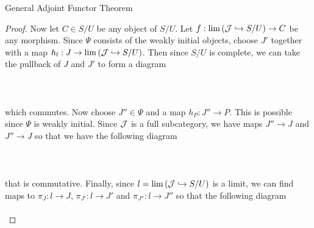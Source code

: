 \documentclass[a4paper]{article}
\begin{document}
\begin{thm}{General Adjoint Functor Theorem}{}
\begin{proof}
Now let $C\in S/U$ be any object of $S/U$. Let $f:\lim\left(\mathcal{J}\hookrightarrow S/U\right)\to C$ be any morphism. Since $\Psi$ consists of the weakly initial objects, choose $J'$ together with a map $h_l:J\to\lim\left(\mathcal{J}\hookrightarrow S/U\right)$. Then since $S/U$ is complete, we can take the pullback of $J$ and $J'$ to form a diagram \\~\\
\\~\\
which commutes. Now choose $J''\in\Psi$ and a map $h_P:J''\to P$. This is possible since $\Psi$ is weakly initial. Since $\mathcal{J}$ is a full subcategory, we have maps $J''\to J$ and $J''\to J$ so that we have the following diagram \\~\\
\\~\\
that is commutative. Finally, since $l=\lim\left(\mathcal{J}\hookrightarrow S/U\right)$ is a limit, we can find maps to $\pi_J:l\to J$, $\pi_{J'}:l\to J'$ and $\pi_{J''}:l\to J''$ so that the following diagram \\~\\
\end{proof}
\end{thm}
\end{document}
